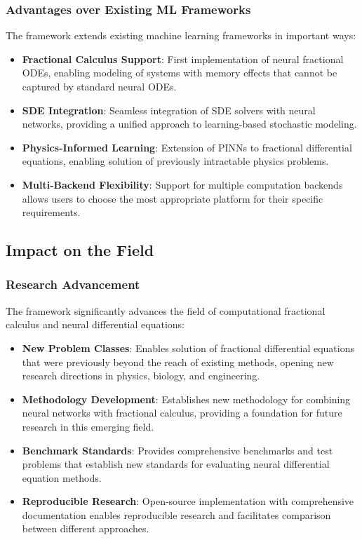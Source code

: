 \subsubsection{Advantages over Existing ML Frameworks}

The framework extends existing machine learning frameworks in important ways:

\begin{itemize}
    \item \textbf{Fractional Calculus Support}: First implementation of neural fractional ODEs, enabling modeling of systems with memory effects that cannot be captured by standard neural ODEs.
    
    \item \textbf{SDE Integration}: Seamless integration of SDE solvers with neural networks, providing a unified approach to learning-based stochastic modeling.
    
    \item \textbf{Physics-Informed Learning}: Extension of PINNs to fractional differential equations, enabling solution of previously intractable physics problems.
    
    \item \textbf{Multi-Backend Flexibility}: Support for multiple computation backends allows users to choose the most appropriate platform for their specific requirements.
\end{itemize}

\subsection{Impact on the Field}

\subsubsection{Research Advancement}

The framework significantly advances the field of computational fractional calculus and neural differential equations:

\begin{itemize}
    \item \textbf{New Problem Classes}: Enables solution of fractional differential equations that were previously beyond the reach of existing methods, opening new research directions in physics, biology, and engineering.
    
    \item \textbf{Methodology Development}: Establishes new methodology for combining neural networks with fractional calculus, providing a foundation for future research in this emerging field.
    
    \item \textbf{Benchmark Standards}: Provides comprehensive benchmarks and test problems that establish new standards for evaluating neural differential equation methods.
    
    \item \textbf{Reproducible Research}: Open-source implementation with comprehensive documentation enables reproducible research and facilitates comparison between different approaches.
\end{itemize}

